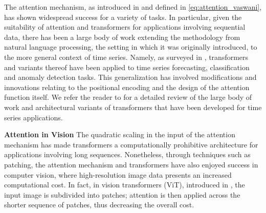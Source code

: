 \documentclass[twoside]{article}
\newcommand{\1}{\mathbbm{1}}
\begin{document}
The attention mechanism, as introduced in \citet{vaswani2017attention} and defined in \eqref{eq:attention_vaswani}, has shown widespread success for a variety of tasks.
In particular, given the suitability of attention and transformers for applications involving sequential data, there has been a large body of work extending the methodology from natural language processing, the setting in which it was originally introduced, to the more general context of time series. Namely, as surveyed in \citet{wen2023transformers}, transformers and variants thereof have been applied to time series forecasting, classification and anomaly detection tasks. This generalization has involved modifications and innovations relating to the positional encoding and the design of the attention function itself. %
We refer the reader to \citet{wen2023transformers} for a detailed review of the large body of work and architectural variants of transformers that have been developed for time series applications.
\par
\textbf{Attention in Vision} The quadratic scaling in the input of the attention mechanism has made transformers a computationally prohibitive architecture for applications involving long sequences. Nonetheless, through techniques such as patching, the attention mechanism and transformers have also enjoyed success in computer vision, where high-resolution image data presents an increased computational cost. In fact, in vision transformers (ViT), introduced in \citet{dosovitskyi2021image}, the input image is subdivided into patches; attention is then applied across the shorter sequence of patches, thus decreasing the overall cost. 
\par
\end{document}
